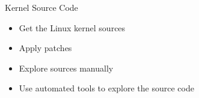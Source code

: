 \setuplabframe
{Kernel Source Code}
{
  \begin{itemize}
  \item Get the Linux kernel sources
  \item Apply patches
  \item Explore sources manually
  \item Use automated tools to explore the source code
  \end{itemize}
}